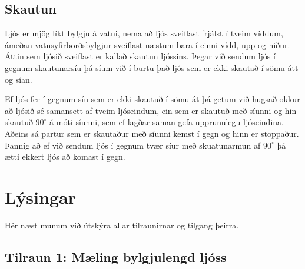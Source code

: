 \documentclass[12pt]{article}
\begin{document}
\subsection{Skautun}

Ljós er mjög líkt bylgju á vatni, nema að ljós sveiflast frjálst í tveim víddum, ámeðan vatnsyfirborðsbylgjur sveiflast næstum bara í einni vídd, upp og niður. Áttin sem ljósið sveiflast er kallað skautun ljóssins. Þegar við sendum ljós í gegnum skautunarsíu þá síum við í burtu það ljós sem er ekki skautað í sömu átt og sían. 

Ef ljós fer í gegnum síu sem er ekki skautuð í sömu át þá getum við hugsað okkur að ljósið sé samansett af tveim ljóseindum, ein sem er skautuð með síunni og hin skautuð $90^\circ$ á móti síunni, sem ef lagðar saman gefa upprunulegu ljóseindina. Aðeins sá partur sem er skautaður með síunni kemst í gegn og hinn er stoppaður. Þannig að ef við sendum ljós í gegnum tvær síur með skuatunarmun af $90^\circ$ þá ætti ekkert ljós að komast í gegn.


\section{Lýsingar}

Hér næst munum við útskýra allar tilraunirnar og tilgang þeirra.

\subsection{Tilraun 1: Mæling bylgjulengd ljóss}
\end{document}
